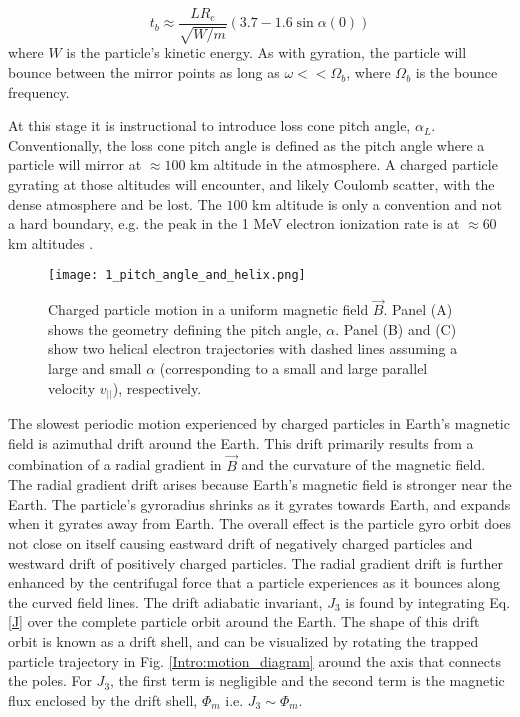 \begin{equation}
t_b \approx \frac{L R_e}{\sqrt{W/m}} (3.7 - 1.6 \sin{\alpha(0)})
\end{equation} where $W$ is the particle's kinetic energy. As with gyration, the particle will bounce between the mirror points as long as $\omega << \Omega_b$, where $\Omega_b$ is the bounce frequency.

At this stage it is instructional to introduce loss cone pitch angle, $\alpha_L$.  Conventionally, the loss cone pitch angle is defined as the pitch angle where a particle will mirror at $\approx 100$ km altitude in the atmosphere. A charged particle gyrating at those altitudes will encounter, and likely Coulomb scatter, with the dense atmosphere and be lost. The $100$ km altitude is only a convention and not a hard boundary, e.g. the peak in the 1 MeV electron ionization rate is at $\approx 60$ km altitudes \citep{Fang2010}.

\begin{figure}
\texttt{[image: 1\_pitch\_angle\_and\_helix.png]}
\caption{Charged particle motion in a uniform magnetic field $\vec{B}$. Panel (A) shows the geometry defining the pitch angle, $\alpha$. Panel (B) and (C) show two helical electron trajectories with dashed lines assuming a large and small $\alpha$ (corresponding to a small and large parallel velocity $v_{||}$), respectively.}
\label{Intro:pa}
\end{figure}

The slowest periodic motion experienced by charged particles in Earth's magnetic field is azimuthal drift around the Earth. This drift primarily results from a combination of a radial gradient in $\vec{B}$ and the curvature of the magnetic field. The radial gradient drift arises because Earth's magnetic field is stronger near the Earth. The particle's gyroradius shrinks as it gyrates towards Earth, and expands when it gyrates away from Earth. The overall effect is the particle gyro orbit does not close on itself causing eastward drift of negatively charged particles and westward drift of positively charged particles. The radial gradient drift is further enhanced by the centrifugal force that a particle experiences as it bounces along the curved field lines. The drift adiabatic invariant, $J_3$ is found by integrating Eq. \ref{J} over the complete particle orbit around the Earth. The shape of this drift orbit is known as a drift shell, and can be visualized by rotating the trapped particle trajectory in Fig. \ref{Intro:motion_diagram} around the axis that connects the poles. For $J_3$, the first term is negligible and the second term is the magnetic flux enclosed by the drift shell, $\Phi_m$  i.e. $J_3 \sim \Phi_m$.

